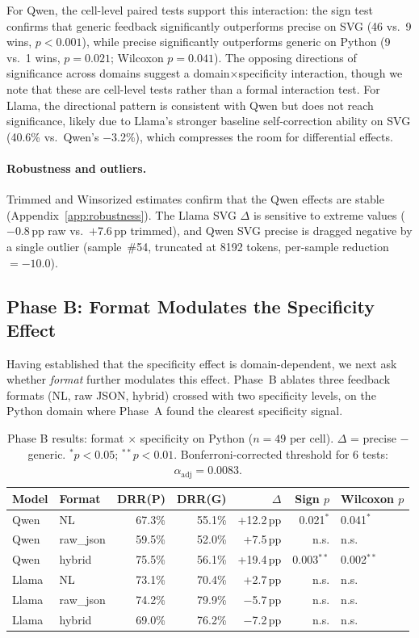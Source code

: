 For Qwen, the cell-level paired tests support this interaction: the sign test confirms that generic feedback significantly outperforms precise on SVG (46 vs.\ 9 wins, $p < 0.001$), while precise significantly outperforms generic on Python (9 vs.\ 1 wins, $p = 0.021$; Wilcoxon $p = 0.041$). The opposing directions of significance across domains suggest a domain$\times$specificity interaction, though we note that these are cell-level tests rather than a formal interaction test. For Llama, the directional pattern is consistent with Qwen but does not reach significance, likely due to Llama's stronger baseline self-correction ability on SVG (40.6\% vs.\ Qwen's $-$3.2\%), which compresses the room for differential effects.

\paragraph{Robustness and outliers.}
Trimmed and Winsorized estimates confirm that the Qwen effects are stable (Appendix~\ref{app:robustness}). The Llama SVG $\Delta$ is sensitive to extreme values ($-$0.8\,pp raw vs.\ $+$7.6\,pp trimmed), and Qwen SVG precise is dragged negative by a single outlier (sample~\#54, truncated at 8192 tokens, per-sample reduction $= -10.0$).

\subsection{Phase B: Format Modulates the Specificity Effect}
\label{sec:results-phaseB}

Having established that the specificity effect is domain-dependent, we next ask whether \emph{format} further modulates this effect. Phase~B ablates three feedback formats (NL, raw JSON, hybrid) crossed with two specificity levels, on the Python domain where Phase~A found the clearest specificity signal.

\begin{table}[t]
\centering
\small
\caption{Phase B results: format $\times$ specificity on Python ($n = 49$ per cell). $\Delta$ = precise $-$ generic. $^{*}p < 0.05$; $^{**}p < 0.01$. Bonferroni-corrected threshold for 6 tests: $\alpha_\text{adj} = 0.0083$.}
\label{tab:phaseB}
\begin{tabular}{llrrrrl}
\toprule
Model & Format & DRR(P) & DRR(G) & $\Delta$ & Sign $p$ & Wilcoxon $p$ \\
\midrule
Qwen & NL & 67.3\% & 55.1\% & +12.2\,pp & 0.021$^{*}$ & 0.041$^{*}$ \\
Qwen & raw\_json & 59.5\% & 52.0\% & +7.5\,pp & n.s. & n.s. \\
Qwen & hybrid & 75.5\% & 56.1\% & +19.4\,pp & 0.003$^{**}$ & 0.002$^{**}$ \\
\midrule
Llama & NL & 73.1\% & 70.4\% & +2.7\,pp & n.s. & n.s. \\
Llama & raw\_json & 74.2\% & 79.9\% & $-$5.7\,pp & n.s. & n.s. \\
Llama & hybrid & 69.0\% & 76.2\% & $-$7.2\,pp & n.s. & n.s. \\
\bottomrule
\end{tabular}
\end{table}

